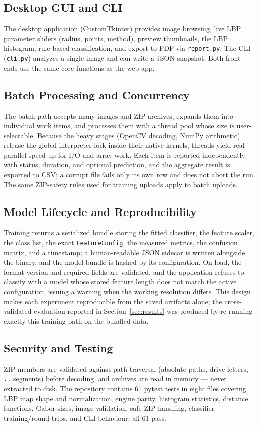 \documentclass[conference]{IEEEtran}
\begin{document}
\subsection{Desktop GUI and CLI}
The desktop application (CustomTkinter) provides image browsing, live LBP
parameter sliders (radius, points, method), preview thumbnails, the LBP
histogram, rule-based classification, and export to PDF via
\texttt{report.py}. The CLI (\texttt{cli.py}) analyzes a single image and
can write a JSON snapshot. Both front ends use the same core functions as
the web app.

\subsection{Batch Processing and Concurrency}
The batch path accepts many images and ZIP archives, expands them into
individual work items, and processes them with a thread pool whose size is
user-selectable. Because the heavy stages (OpenCV decoding, NumPy
arithmetic) release the global interpreter lock inside their native
kernels, threads yield real parallel speed-up for I/O and array work. Each
item is reported independently with status, duration, and optional
prediction, and the aggregate result is exported to CSV; a corrupt file
fails only its own row and does not abort the run. The same ZIP-safety
rules used for training uploads apply to batch uploads.

\subsection{Model Lifecycle and Reproducibility}
Training returns a serialized bundle storing the fitted classifier, the
feature scaler, the class list, the exact \texttt{FeatureConfig}, the
measured metrics, the confusion matrix, and a timestamp; a human-readable
JSON sidecar is written alongside the binary, and the model bundle is
hashed by its configuration. On load, the format version and required
fields are validated, and the application refuses to classify with a model
whose stored feature length does not match the active configuration,
issuing a warning when the working resolution differs. This design makes
each experiment reproducible from the saved artifacts alone; the
cross-validated evaluation reported in Section~\ref{sec:results} was
produced by re-running exactly this training path on the bundled data.

\subsection{Security and Testing}
ZIP members are validated against path traversal (absolute paths, drive
letters, \texttt{..} segments) before decoding, and archives are read in
memory --- never extracted to disk. The repository contains 61 pytest tests
in eight files covering LBP map shape and normalization, engine parity,
histogram statistics, distance functions, Gabor sizes, image validation,
safe ZIP handling, classifier training/round-trips, and CLI behaviour; all
61 pass.
\end{document}
